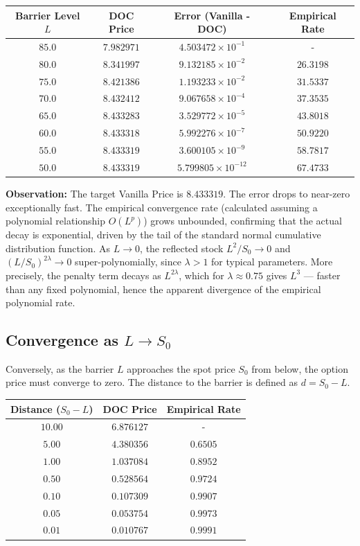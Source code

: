 \documentclass{report}
\begin{document}
\begin{center}
\begin{tabular}{cccc}
\toprule
Barrier Level $L$ & DOC Price & Error (Vanilla - DOC) & Empirical Rate \\
\midrule
$85.0$ & $7.982971$ & $4.503472 \times 10^{-1}$ & - \\
$80.0$ & $8.341997$ & $9.132185 \times 10^{-2}$ & $26.3198$ \\
$75.0$ & $8.421386$ & $1.193233 \times 10^{-2}$ & $31.5337$ \\
$70.0$ & $8.432412$ & $9.067658 \times 10^{-4}$ & $37.3535$ \\
$65.0$ & $8.433283$ & $3.529772 \times 10^{-5}$ & $43.8018$ \\
$60.0$ & $8.433318$ & $5.992276 \times 10^{-7}$ & $50.9220$ \\
$55.0$ & $8.433319$ & $3.600105 \times 10^{-9}$ & $58.7817$ \\
$50.0$ & $8.433319$ & $5.799805 \times 10^{-12}$ & $67.4733$ \\
\bottomrule
\end{tabular}
\end{center}

\textbf{Observation:} The target Vanilla Price is $8.433319$. The error drops to near-zero exceptionally fast. The empirical convergence rate (calculated assuming a polynomial relationship $O(L^p)$) grows unbounded, confirming that the actual decay is exponential, driven by the tail of the standard normal cumulative distribution function. As $L \to 0$, the reflected stock $L^2/S_0 \to 0$ and $(L/S_0)^{2\lambda} \to 0$ super-polynomially, since $\lambda > 1$ for typical parameters. More precisely, the penalty term decays as $L^{2\lambda}$, which for $\lambda \approx 0.75$ gives $L^3$ --- faster than any fixed polynomial, hence the apparent divergence of the empirical polynomial rate.

\subsection{Convergence as $L \to S_0$}
Conversely, as the barrier $L$ approaches the spot price $S_0$ from below, the option price must converge to zero. The distance to the barrier is defined as $d = S_0 - L$.

\begin{center}
\begin{tabular}{ccc}
\toprule
Distance ($S_0 - L$) & DOC Price & Empirical Rate \\
\midrule
$10.00$ & $6.876127$ & - \\
$5.00$ & $4.380356$ & $0.6505$ \\
$1.00$ & $1.037084$ & $0.8952$ \\
$0.50$ & $0.528564$ & $0.9724$ \\
$0.10$ & $0.107309$ & $0.9907$ \\
$0.05$ & $0.053754$ & $0.9973$ \\
$0.01$ & $0.010767$ & $0.9991$ \\
\bottomrule
\end{tabular}
\end{center}
\end{document}
